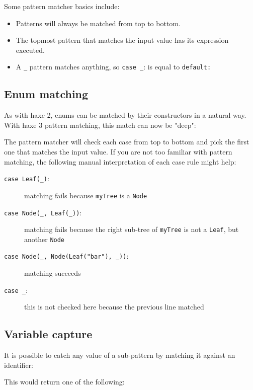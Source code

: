 \documentclass[a4paper,oneside]{book}
\newcommand{\expr}[1]{\texttt{#1}}
\newcommand{\haxe}[2][]{%
}
\begin{document}
Some pattern matcher basics include:

\begin{itemize}
	\item Patterns will always be matched from top to bottom.
	\item The topmost pattern that matches the input value has its expression executed.
	\item A \expr{_} pattern matches anything, so \expr{case _}: is equal to \expr{default:}
\end{itemize}

\subsection{Enum matching}
\label{lf-pattern-matching-enums}

As with haxe 2, enums can be matched by their constructors in a natural way. With haxe 3 pattern matching, this match can now be "deep":

\haxe[firstline=8,lastline=19]{assets/PatternMatching.hx}

The pattern matcher will check each case from top to bottom and pick the first one that matches the input value. If you are not too familiar with pattern matching, the following manual interpretation of each case rule might help:

\begin{description}
	\item[\expr{case Leaf(_)}:] matching fails because \expr{myTree} is a \expr{Node}
	\item[\expr{case Node(_, Leaf(_))}:] matching fails because the right sub-tree of \expr{myTree} is not a \expr{Leaf}, but another \expr{Node}
	\item[\expr{case Node(_, Node(Leaf("bar"), _))}:] matching succeeds
	\item[\expr{case _}:] this is not checked here because the previous line matched
\end{description}

\subsection{Variable capture}
\label{lf-pattern-matching-variable-capture}

It is possible to catch any value of a sub-pattern by matching it against an identifier:

\haxe[firstline=22,lastline=28]{assets/PatternMatching.hx}

This would return one of the following:
\end{document}
